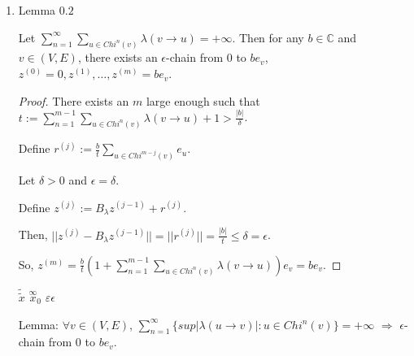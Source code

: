 \documentclass{article}
\begin{document}
\begin{enumerate}
\begin{proof}
\medskip

\centerline{$ = \displaystyle\sum^{n-1}_{m-1}
\hspace{0.2cm}\sum_{u\in Chi^m(v)}\hspace{-0.3cm}\lambda(v \rightarrow u) +1 \geq t$.}

Then since $t$ is arbitrarily large, we have,

\medskip

\centerline{$ \displaystyle\sum^{\infty}_{m-1}
\hspace{0.2cm}\sum_{u\in Chi^m(v)}\hspace{-0.3cm}\lambda(v\rightarrow u) = +\infty$} 
as desired.



\end{proof}





\item Lemma $0.2$

Let $\displaystyle\sum^{\infty}_{n=1} \sum_{u \in Chi^n(v)} \lambda(v \to u) = +\infty$. Then for any $b \in \mathbb{C}$ and $v \in (V,E)$, there exists an $\epsilon$-chain from $0$ to $be_v$, $z^{(0)}=0, z^{(1)}, \dots, z^{(m)}=be_v$.

\begin{proof}
    There exists an $m$ large enough such that $t:=\displaystyle\sum^{m-1}_{n=1} \sum_{u \in Chi^n(v)} \lambda(v \to u) + 1 > \frac{|b|}{\delta}$.

    Define $r^{(j)}:=\frac{b}{t} \sum_{u \in Chi^{m-j}(v)} e_u$.
    
    Let $\delta>0$ and $\epsilon = \delta$.
    
    Define $z^{(j)}:= B_\lambda z^{(j-1)} + r^{(j)}$.

    Then, $||z^{(j)}-B_\lambda z^{(j-1)}|| = ||r^{(j)}|| = \frac{|b|}{t} \leq \delta = \epsilon$.

    So, $z^{(m)} = \frac{b}{t} (1 + \sum^{m-1}_{n=1} \sum_{u \in Chi^n(v)} \lambda(v \to u)) e_v = be_v$.
\end{proof}

$\tilde{\tilde{x}}$ 
$\overset{\infty}{x}_0$
$\varepsilon \epsilon$





Lemma: $\forall v \in (V,E)$,
$\displaystyle\sum^\infty_{n=1}\{sup|\lambda(u\rightarrow v)|:u\in Chi^n(v)\}=+\infty$ $\Rightarrow$ $\epsilon$-chain from $0$ to $be_v$.


\end{enumerate}
\end{document}
